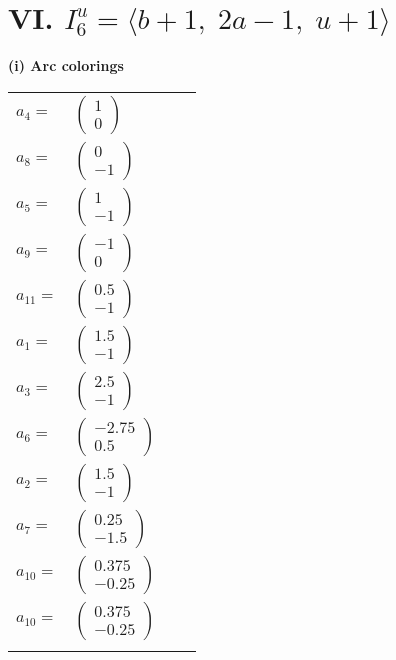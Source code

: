\documentclass[1p]{elsarticle_modified}
\theoremstyle{definition}
\begin{document}
\centering \section*{VI. $I^u_{6}= \langle b+1,\;2 a-1,\;u+1 \rangle$}
\flushleft \textbf{(i) Arc colorings}\\
\begin{tabular}{m{7pt} m{180pt} m{7pt} m{180pt} }
\flushright $a_{4}=$&$\begin{pmatrix}1\\0\end{pmatrix}$ \\
\flushright $a_{8}=$&$\begin{pmatrix}0\\-1\end{pmatrix}$ \\
\flushright $a_{5}=$&$\begin{pmatrix}1\\-1\end{pmatrix}$ \\
\flushright $a_{9}=$&$\begin{pmatrix}-1\\0\end{pmatrix}$ \\
\flushright $a_{11}=$&$\begin{pmatrix}0.5\\-1\end{pmatrix}$ \\
\flushright $a_{1}=$&$\begin{pmatrix}1.5\\-1\end{pmatrix}$ \\
\flushright $a_{3}=$&$\begin{pmatrix}2.5\\-1\end{pmatrix}$ \\
\flushright $a_{6}=$&$\begin{pmatrix}-2.75\\0.5\end{pmatrix}$ \\
\flushright $a_{2}=$&$\begin{pmatrix}1.5\\-1\end{pmatrix}$ \\
\flushright $a_{7}=$&$\begin{pmatrix}0.25\\-1.5\end{pmatrix}$ \\
\flushright $a_{10}=$&$\begin{pmatrix}0.375\\-0.25\end{pmatrix}$\\ \flushright $a_{10}=$&$\begin{pmatrix}0.375\\-0.25\end{pmatrix}$\\&\end{tabular}
\end{document}
